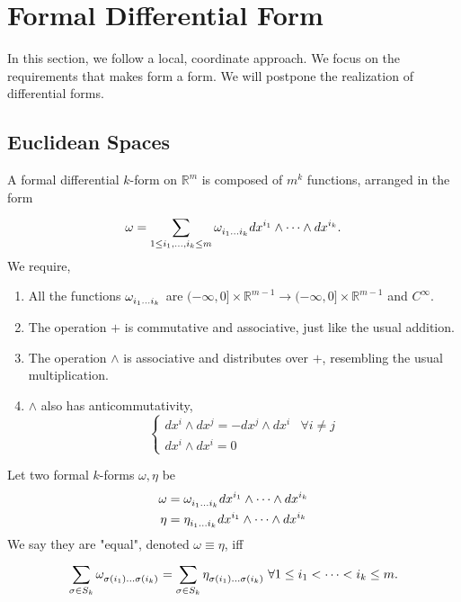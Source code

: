 \documentclass[../main.tex]{subfiles}
\begin{document}
    \section{Formal Differential Form}
    \begin{remark}
        In this section, we follow a local, coordinate approach. We focus on the 
        requirements that makes form a form. We will postpone the realization of 
        differential forms.
    \end{remark}
    \subsection{Euclidean Spaces}
    \begin{definition}\label{def:formal-form}
        A formal differential \(k\)-form on \(\mathbb{R}^m\) is composed of \(m^k\) 
        functions, arranged in the form
        \[
        \omega = \sum_{1 \leq i_1, \dots, i_k \leq m}^{} 
        \omega \indices{_{i_1}_\dots_{i_k}} dx^{i_1} \wedge \dots \wedge dx^{i_k}.
        \]
        We require,
        \begin{enumerate}
            \item All the functions \(\omega \indices{_{i_1}_\dots_{i_k}}\)
            are \((-\infty, 0]\times\mathbb{R}^{m-1} \to (-\infty, 0]\times\mathbb{R}^{m-1}\) and \(C^\infty\).
            \item The operation \(+\) is commutative and associative, just like the 
            usual addition.
            \item The operation \(\wedge\) is associative and distributes over 
            \(+\), resembling the usual multiplication.
            \item \(\wedge\) also has anticommutativity, 
            \[
            \begin{cases}
            dx^i \wedge dx^j = -dx^j \wedge dx^i &\forall i \neq j\\
            dx^i \wedge dx^i = 0
            \end{cases}
            \]
        \end{enumerate}
    \end{definition}
    \begin{definition}\label{def:formal-form-equality}
        Let two formal \(k\)-forms \(\omega, \eta\) be 
        \[
        \begin{aligned}
            \omega &= \omega\indices{_{i_1}_\dots_{i_k}} 
                dx^{i_1} \wedge \dots \wedge dx^{i_k}\\
            \eta &= \eta\indices{_{i_1}_\dots_{i_k}} 
                dx^{i_1} \wedge \dots \wedge dx^{i_k}
        \end{aligned}
        \]
        We say they are "equal", denoted \(\omega \equiv \eta\), iff 
        \[
        \sum_{\sigma \in S_k}^{} \omega\indices{_{\sigma(i_1)}_\dots_{\sigma(i_k)}}
        =\sum_{\sigma \in S_k}^{} \eta\indices{_{\sigma(i_1)}_\dots_{\sigma(i_k)}}
        \;\forall 1 \leq i_1 < \dots < i_k \leq m.
        \]
    \end{definition}
\end{document}
